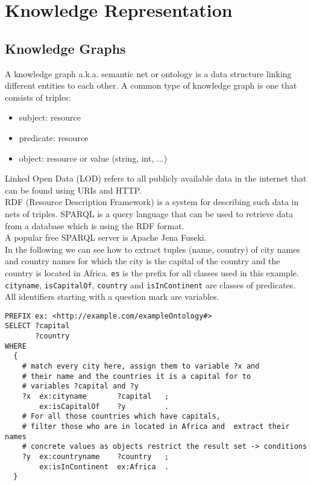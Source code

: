 \section{Knowledge Representation}

\subsection{Knowledge Graphs}

A knowledge graph a.k.a. semantic net or ontology is a data structure linking different entities to each other. A common type of knowledge graph is one that consists of triples:

\begin{itemize}
    \item subject: resource
    \item predicate: resource
    \item object: resource or value (string, int, ...)
\end{itemize}

Linked Open Data (LOD) refers to all publicly available data in the internet that can be found using URIs and HTTP.\\
RDF (Resource Description Framework) is a system for describing such data in nets of triples. SPARQL is a query language that can be used to retrieve data from a database which is using the RDF format.\\
A popular free SPARQL server is Apache Jena Fuseki.\\

In the following we can see how to extract tuples (name, country) of city names and country names for which the city is the capital of the country and the country is located in Africa. \lstinline{es} is the prefix for all classes used in this example. \lstinline{cityname}, \lstinline{isCapitalOf}, \lstinline{country} and \lstinline{isInContinent} are classes of predicates. All identifiers starting with a question mark are variables.\\


\begin{lstlisting}[language=SPARQL]
PREFIX ex: <http://example.com/exampleOntology#>
SELECT ?capital
       ?country
WHERE
  {
    # match every city here, assign them to variable ?x and
    # their name and the countries it is a capital for to
    # variables ?capital and ?y
    ?x  ex:cityname       ?capital   ;
        ex:isCapitalOf    ?y         .
    # For all those countries which have capitals,
    # filter those who are in located in Africa and  extract their names
    # concrete values as objects restrict the result set -> conditions
    ?y  ex:countryname    ?country   ;
        ex:isInContinent  ex:Africa  . 
  }
\end{lstlisting}




